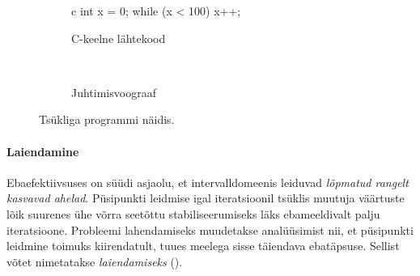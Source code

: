 \documentclass[../thesis.tex]{subfiles}
\begin{document}
\begin{figure}
	\centering
	\begin{subfigure}[b]{0.4\textwidth}
		\centering
		\begin{bminted}{c}
			int x = 0;
			while (x < 100)
				x++;
		\end{bminted}
		\caption{C-keelne lähtekood}
	\end{subfigure}
	~
	\begin{subfigure}[b]{0.4\textwidth}
		\centering
		\caption{Juhtimisvoograaf}
	\end{subfigure}

	\caption{Tsükliga programmi näidis.}
	\label{fig:prog-while}
\end{figure}

\paragraph{Laiendamine}
Ebaefektiivsuses on süüdi asjaolu, et intervalldomeenis leiduvad \emph{lõpmatud rangelt kasvavad ahelad}.
Püsipunkti leidmise igal iteratsioonil tsüklis muutuja väärtuste lõik suurenes ühe võrra seetõttu stabiliseerumiseks läks ebameeldivalt palju iteratsioone. Probleemi lahendamiseks muudetakse analüüsimist nii, et püsipunkti leidmine toimuks kiirendatult, tuues meelega sisse täiendava ebatäpsuse. Sellist võtet nimetatakse \emph{laiendamiseks} ().
\end{document}
